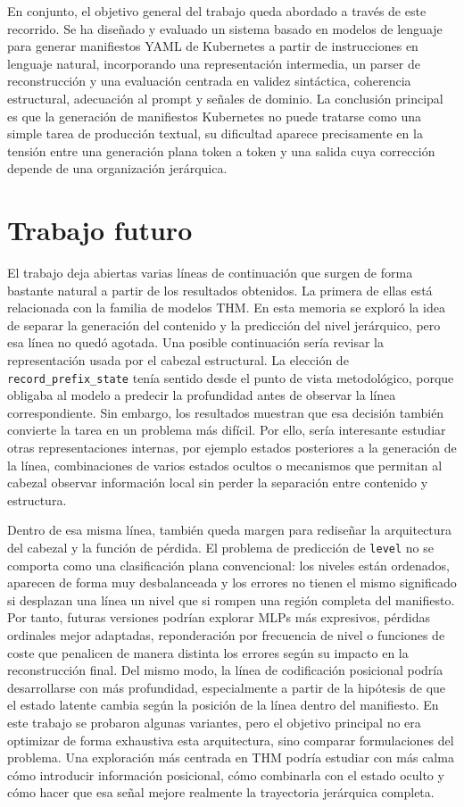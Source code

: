 En conjunto, el objetivo general del trabajo queda abordado a través de este recorrido. Se ha diseñado y evaluado un sistema
basado en modelos de lenguaje para generar manifiestos YAML de Kubernetes a partir de instrucciones en lenguaje natural, incorporando
una representación intermedia, un parser de reconstrucción y una evaluación centrada en validez sintáctica, coherencia estructural,
adecuación al prompt y señales de dominio. La conclusión principal es que la generación de manifiestos Kubernetes no puede tratarse
como una simple tarea de producción textual, su dificultad aparece precisamente en la tensión entre una generación plana token a
token y una salida cuya corrección depende de una organización jerárquica.

\section{Trabajo futuro}

El trabajo deja abiertas varias líneas de continuación que surgen de forma bastante natural a partir de los resultados obtenidos.
La primera de ellas está relacionada con la familia de modelos THM. En esta memoria se exploró la idea de separar
la generación del contenido y la predicción del nivel jerárquico, pero esa línea no quedó agotada. Una posible continuación sería
revisar la representación usada por el cabezal estructural. La elección de \texttt{record\_prefix\_state} tenía sentido desde el
punto de vista metodológico, porque obligaba al modelo a predecir la profundidad antes de observar la línea correspondiente.
Sin embargo, los resultados muestran que esa decisión también convierte la tarea en un problema más difícil. Por ello, sería
interesante estudiar otras representaciones internas, por ejemplo estados posteriores a la generación de la línea, combinaciones
de varios estados ocultos o mecanismos que permitan al cabezal observar información local sin perder la separación entre contenido y estructura.

Dentro de esa misma línea, también queda margen para rediseñar la arquitectura del cabezal y la función de pérdida. El problema de
predicción de \texttt{level} no se comporta como una clasificación plana convencional: los niveles están ordenados, aparecen de
forma muy desbalanceada y los errores no tienen el mismo significado si desplazan una línea un nivel que si rompen una región
completa del manifiesto. Por tanto, futuras versiones podrían explorar MLPs más expresivos, pérdidas ordinales mejor adaptadas,
reponderación por frecuencia de nivel o funciones de coste que penalicen de manera distinta los errores según su impacto en la
reconstrucción final. Del mismo modo, la línea de codificación posicional podría desarrollarse con más profundidad, especialmente
a partir de la hipótesis de que el estado latente cambia según la posición de la línea dentro del manifiesto. En este trabajo se
probaron algunas variantes, pero el objetivo principal no era optimizar de forma exhaustiva esta arquitectura, sino comparar
formulaciones del problema. Una exploración más centrada en THM podría estudiar con más calma cómo introducir información posicional,
cómo combinarla con el estado oculto y cómo hacer que esa señal mejore realmente la trayectoria jerárquica completa.

